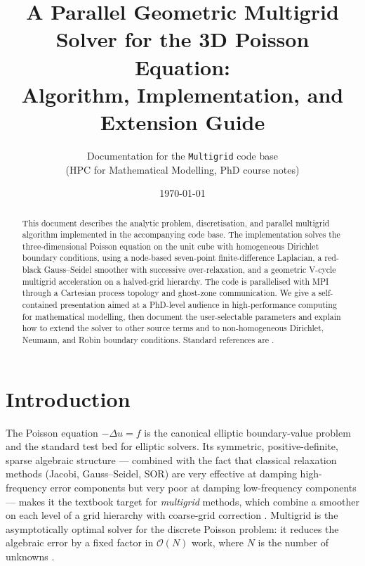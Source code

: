 \documentclass[11pt]{article}
\title{A Parallel Geometric Multigrid Solver for the 3D Poisson Equation:\\
       Algorithm, Implementation, and Extension Guide}
\author{Documentation for the \texttt{Multigrid} code base\\
        \small (HPC for Mathematical Modelling, PhD course notes)}
\date{\today}
\theoremstyle{definition}
\newcommand{\bigO}{\mathcal{O}}
\begin{document}
\maketitle

\begin{abstract}
This document describes the analytic problem, discretisation, and
parallel multigrid algorithm implemented in the accompanying code base.
The implementation solves the three-dimensional Poisson equation on
the unit cube with homogeneous Dirichlet boundary conditions, using a
node-based seven-point finite-difference Laplacian, a red-black
Gauss--Seidel smoother with successive over-relaxation, and a geometric
V-cycle multigrid acceleration on a halved-grid hierarchy.  The code is
parallelised with MPI through a Cartesian process topology and ghost-zone
communication.  We give a self-contained presentation aimed at a PhD-level
audience in high-performance computing for mathematical modelling, then
document the user-selectable parameters and explain how to extend the
solver to other source terms and to non-homogeneous Dirichlet, Neumann,
and Robin boundary conditions.  Standard references are
\cite{briggs2000multigrid,trottenberg2001multigrid,hackbusch1985multi,
saad2003iterative,leveque2007finite}.
\end{abstract}

\tableofcontents
\bigskip

\section{Introduction}

The Poisson equation $-\Delta u = f$ is the canonical elliptic boundary-value
problem and the standard test bed for elliptic solvers.  Its symmetric,
positive-definite, sparse algebraic structure --- combined with the fact
that classical relaxation methods (Jacobi, Gauss--Seidel, SOR) are very
effective at damping high-frequency error components but very poor at
damping low-frequency components --- makes it the textbook target for
\emph{multigrid} methods, which combine a smoother on each level of a
grid hierarchy with coarse-grid correction
\cite{brandt1977multilevel,fedorenko1964relaxation,
hackbusch1985multi,trottenberg2001multigrid}.  Multigrid is the
asymptotically optimal solver for the discrete Poisson problem: it
reduces the algebraic error by a fixed factor in
$\bigO(N)$ work, where $N$ is the number of unknowns
\cite[Ch.~5]{briggs2000multigrid}.
\end{document}
